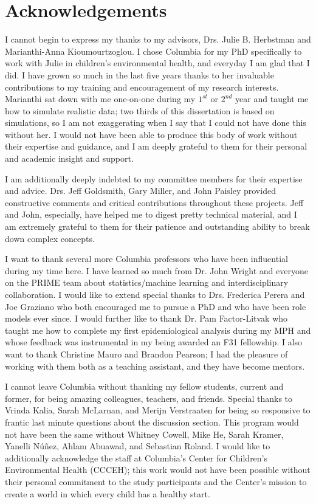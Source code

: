 \chapter{Acknowledgements}

I cannot begin to express my thanks to my advisors, Drs. Julie B. Herbstman and Marianthi-Anna Kioumourtzoglou. I chose Columbia for my PhD specifically to work with Julie in children's environmental health, and everyday I am glad that I did. I have grown so much in the last five years thanks to her invaluable contributions to my training and encouragement of my research interests. Marianthi sat down with me one-on-one during my $1^{st}$ or $2^{nd}$ year and taught me how to simulate realistic data; two thirds of this dissertation is based on simulations, so I am not exaggerating when I say that I could not have done this without her. I would not have been able to produce this body of work without their expertise and guidance, and I am deeply grateful to them for their personal and academic insight and support.

I am additionally deeply indebted to my committee members for their expertise and advice. Drs. Jeff Goldsmith, Gary Miller, and John Paisley provided constructive comments and critical contributions throughout these projects. Jeff and John, especially, have helped me to digest pretty technical material, and I am extremely grateful to them for their patience and outstanding ability to break down complex concepts.

I want to thank several more Columbia professors who have been influential during my time here. I have learned so much from Dr. John Wright and everyone on the PRIME team about statistics/machine learning and interdisciplinary collaboration. I would like to extend special thanks to Drs. Frederica Perera and Joe Graziano who both encouraged me to pursue a PhD and who have been role models ever since. I would further like to thank Dr. Pam Factor-Litvak who taught me how to complete my first epidemiological analysis during my MPH and whose feedback was instrumental in my being awarded an F31 fellowship. I also want to thank Christine Mauro and Brandon Pearson; I had the pleasure of working with them both as a teaching assistant, and they have become mentors.

I cannot leave Columbia without thanking my fellow students, current and former, for being amazing colleagues, teachers, and friends. Special thanks to Vrinda Kalia, Sarah McLarnan, and Merijn Verstraaten for being so responsive to frantic last minute questions about the discussion section. This program would not have been the same without Whitney Cowell, Mike He, Sarah Kramer, Yanelli N\'{u}\~{n}ez, Ahlam Abuawad, and Sebastian Roland. I would like to additionally acknowledge the staff at Columbia's Center for Children's Environmental Health (CCCEH); this work would not have been possible without their personal commitment to the study participants and the Center's mission to create a world in which every child has a healthy start.

